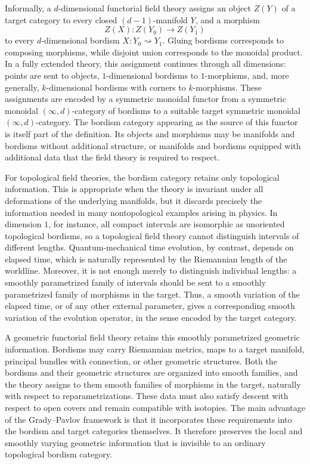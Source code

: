\documentclass{amsart}
\theoremstyle{definition}
\numberwithin{equation}{subsection}
\numberwithin{subsubsection}{subsection}
\begin{document}
Informally, a \(d\)-dimensional functorial field theory assigns an object
\(Z(Y)\) of a target category to every closed \((d-1)\)-manifold \(Y\), and a
morphism
\[
  Z(X)\colon Z(Y_0)\longrightarrow Z(Y_1)
\]
to every \(d\)-dimensional bordism \(X\colon Y_0\rightsquigarrow Y_1\). Gluing
bordisms corresponds to composing morphisms, while disjoint union corresponds to
the monoidal product. In a fully extended theory, this assignment continues
through all dimensions: points are sent to objects, \(1\)-dimensional bordisms
to \(1\)-morphisms, and, more generally, \(k\)-dimensional bordisms with corners
to \(k\)-morphisms. These assignments are encoded by a symmetric monoidal
functor from a symmetric monoidal \((\infty,d)\)-category of bordisms to a
suitable target symmetric monoidal \((\infty,d)\)-category. The bordism category
appearing as the source of this functor is itself part of the definition. Its
objects and morphisms may be manifolds and bordisms without additional
structure, or manifolds and bordisms equipped with additional data that the
field theory is required to respect.

For topological field theories, the bordism category retains only topological
information. This is appropriate when the theory is invariant
under all deformations of the underlying manifolds, but it discards precisely
the information needed in many nontopological examples arising in physics. In
dimension \(1\),
for instance, all compact intervals are isomorphic as unoriented topological
bordisms, so a topological field theory cannot distinguish intervals of
different lengths. Quantum-mechanical time evolution, by contrast, depends on
elapsed time, which is naturally represented by the Riemannian length of the
worldline. Moreover, it is not enough merely to distinguish individual
lengths: a smoothly parametrized family of intervals should be sent to a
smoothly parametrized family of morphisms in the target. Thus, a smooth
variation of the elapsed time, or of any other external parameter, gives a
corresponding smooth variation of the evolution operator, in the sense
encoded by the target category.

A geometric functorial field theory retains this smoothly parametrized geometric
information. Bordisms may carry Riemannian metrics, maps to a target manifold,
principal bundles with connection, or other geometric structures. Both the
bordisms and their geometric structures are organized into smooth families,
and the theory assigns to them smooth families of morphisms in the target,
naturally with respect to reparametrizations. These data must also
satisfy descent with respect to open covers and remain compatible with
isotopies. The main advantage of the Grady--Pavlov framework
\cite{GP22,GP23,GP26} is that it incorporates these requirements into the
bordism and target categories themselves. It therefore preserves the local
and smoothly varying geometric information that is invisible to an ordinary
topological bordism category.
\end{document}
